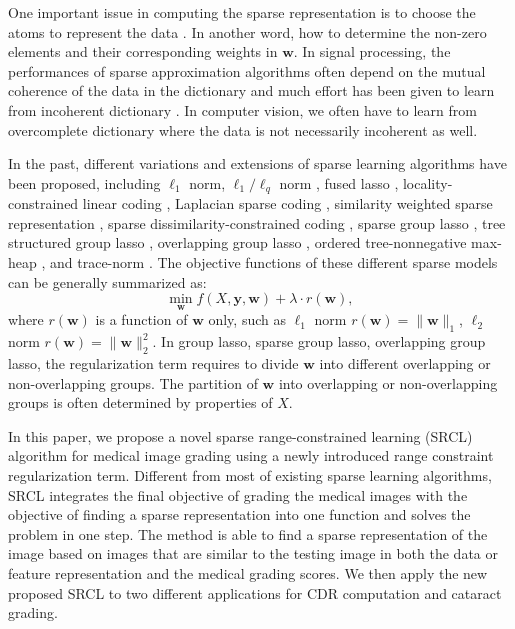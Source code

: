 \documentclass[journal]{IEEEtran}
\begin{document}
      One important issue in computing the sparse representation is to choose the atoms   to represent the data \cite{Wright10}. In another word, how to determine the non-zero elements and their corresponding weights in $\textbf{w}$. In signal processing,  the performances of sparse approximation algorithms often depend  on the mutual coherence of the data in the dictionary and much effort has been given to learn from incoherent dictionary  \cite{6451295}.
    In computer vision, we often have to learn from overcomplete   dictionary  where the data is  not necessarily incoherent as well. %

  In the past, different variations and extensions of sparse learning  algorithms have been proposed, including $\ell_1$ norm, $\ell_1/\ell_q$ norm \cite{Argyriou2008},   fused lasso \cite{Tibshirani2005}, locality-constrained linear coding \cite{llc2010}, Laplacian sparse coding \cite{gao2010}, similarity weighted sparse representation \cite{guo2012}, sparse dissimilarity-constrained coding \cite{CJ15}, sparse group lasso \cite{sparsegrouplasso2010}, tree structured group lasso \cite{Jacob2009}, overlapping group lasso \cite{vijver2002}, ordered tree-nonnegative max-heap \cite{Zhao_thecomposite}, and trace-norm \cite{945730}.
  The objective functions of these different sparse models can be  generally summarized as:
  \begin{equation}
     \min_\textbf{w} f(X, \textbf{y}, \textbf{w})+ \lambda \cdot r(\textbf{w}),  \label{eq4}
  \end{equation}
     where  $r(\textbf{w})$ is a function of $\textbf{w}$ only, such as $\ell_1$ norm $r(\textbf{w})=\|\textbf{w}\|_1$, $\ell_2$ norm $r(\textbf{w})=\|\textbf{w}\|_2^2$. In group lasso,  sparse group lasso, overlapping group lasso, the regularization term requires to divide $\textbf{w}$ into different overlapping or non-overlapping groups. The partition of   $\textbf{w}$ into overlapping or non-overlapping groups is often determined by properties of $X$.

     In this paper,
     we propose  a novel sparse range-constrained learning (SRCL)
     algorithm for medical image grading using a newly introduced range constraint regularization term. Different from most of existing
     sparse learning algorithms, SRCL integrates the final objective of grading the medical images  with the objective of finding a sparse representation into one function and solves the problem in one step. The method is able to find a sparse
     representation of the image based on images that are similar to the testing image in
     both the data or feature representation and the medical grading scores.
      We then apply
     the new proposed SRCL to two different applications for CDR computation and cataract grading.
\end{document}
